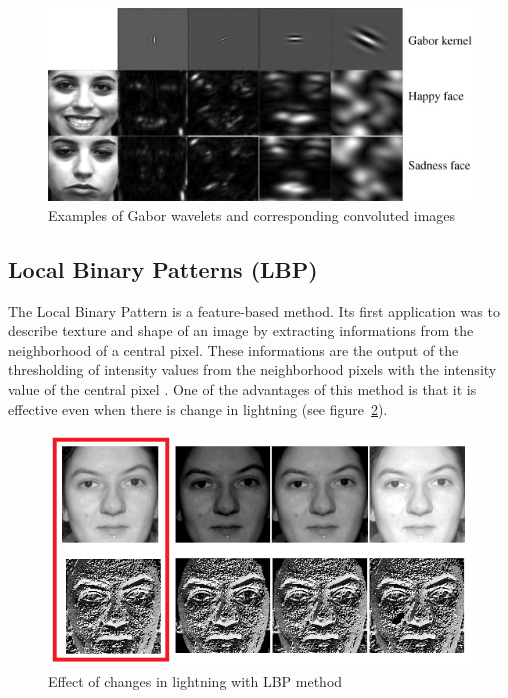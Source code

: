 \begin{figure}[!h]
\begin{center}
\noindent \includegraphics[scale=1]{figures/gabor_wavelets_example} 
\newline
\caption{Examples of Gabor wavelets and corresponding convoluted images}
\label{gabor_wavelets_example}
\end{center} 
\end{figure}

\subsection{Local Binary Patterns (LBP)}

\vspace{\baselineskip}
\noindent The Local Binary Pattern is a feature-based method. Its first application was to describe texture and shape of an image by extracting informations from the neighborhood of a central pixel. These informations are the output of the thresholding of intensity values from the neighborhood pixels with the intensity value of the central pixel \cite{GAN08}. One of the advantages of this method is that it is effective even when there is change in lightning (see figure~\ref{lbp_change_lightning}).
\newline

\begin{figure}[!h]
\begin{center}
\noindent \includegraphics[scale=0.6]{figures/lbp_change_lightning} 
\newline
\caption{Effect of changes in lightning with LBP method}
\label{lbp_change_lightning}
\end{center} 
\end{figure}

